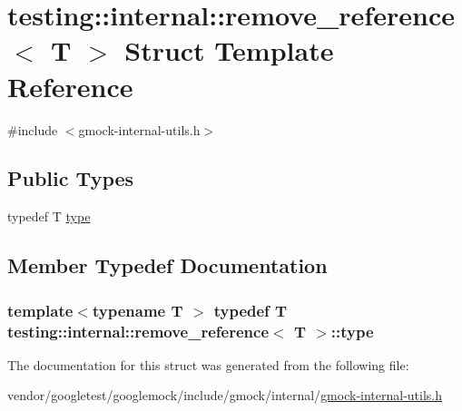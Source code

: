 \hypertarget{structtesting_1_1internal_1_1remove__reference}{}\section{testing\+:\+:internal\+:\+:remove\+\_\+reference$<$ T $>$ Struct Template Reference}
\label{structtesting_1_1internal_1_1remove__reference}


{\ttfamily \#include $<$gmock-\/internal-\/utils.\+h$>$}

\subsection*{Public Types}
\begin{DoxyCompactItemize}
\item 
typedef T \hyperlink{structtesting_1_1internal_1_1remove__reference_a291edca52c59a0d211977d4802439b8a}{type}
\end{DoxyCompactItemize}


\subsection{Member Typedef Documentation}
\subsubsection[{\texorpdfstring{type}{type}}]{\setlength{\rightskip}{0pt plus 5cm}template$<$typename T $>$ typedef T {\bf testing\+::internal\+::remove\+\_\+reference}$<$ T $>$\+::{\bf type}}\hypertarget{structtesting_1_1internal_1_1remove__reference_a291edca52c59a0d211977d4802439b8a}{}\label{structtesting_1_1internal_1_1remove__reference_a291edca52c59a0d211977d4802439b8a}


The documentation for this struct was generated from the following file\+:\begin{DoxyCompactItemize}
\item 
vendor/googletest/googlemock/include/gmock/internal/\hyperlink{gmock-internal-utils_8h}{gmock-\/internal-\/utils.\+h}\end{DoxyCompactItemize}
